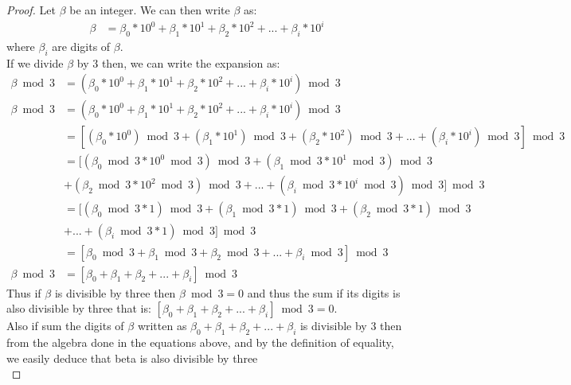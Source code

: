 \documentclass[12pt, fullpage]{article}
\begin{document}
\begin{proof}
 Let $\beta$ be an integer. We can then write $\beta$ as:
\begin{align*}
\beta &= \beta_0*10^0 + \beta_1 * 10^1 + \beta_2 * 10^2 + ... + \beta_i * 10^i
\end{align*}
where $\beta_i$ are digits of $\beta$.\\
If we divide $\beta$ by 3 then, we can write the expansion as: 
\begin{align*}
\beta\bmod 3 &= ( \beta_0*10^0 + \beta_1 * 10^1 + \beta_2 * 10^2 + ... + \beta_i * 10^i ) \bmod 3\\
\beta\bmod 3 &= ( \beta_0*10^0 + \beta_1 * 10^1 + \beta_2 * 10^2 + ... + \beta_i * 10^i ) \bmod 3  \\
&= [ (\beta_0*10^0) \bmod 3 + (\beta_1 * 10^1) \bmod 3 + (\beta_2 * 10^2) \bmod 3 + ... + (\beta_i * 10^i) \bmod 3 ]\bmod 3 \\
&= [ (\beta_0\bmod 3*10^0\bmod3) \bmod 3 + (\beta_1\bmod 3 * 10^1\bmod 3) \bmod 3 \\& +(\beta_2\bmod 3 * 10^2\bmod 3) \bmod 3 + ... + (\beta_i\bmod 3 * 10^i\bmod 3) \bmod 3 ]\bmod 3 \\
&=[(\beta_0\bmod 3*1) \bmod 3 + (\beta_1\bmod 3 * 1) \bmod 3 +(\beta_2\bmod 3 * 1)\bmod 3 \\& + ... + (\beta_i\bmod 3 * 1) \bmod 3 ]\bmod 3\\
&= [ \beta_0 \bmod 3 + \beta_1\bmod 3+\beta_2\bmod 3 + ... + \beta_i\bmod 3 ]\bmod 3\\
\beta\bmod 3 &= [ \beta_0+ \beta_1 + \beta_2 + ... + \beta_i ]\bmod 3
\end{align*}
Thus if $\beta$ is divisible by three then $\beta\bmod 3 = 0$ and thus the sum if its digits is also divisible by three that is: $[ \beta_0+ \beta_1 + \beta_2 + ... + \beta_i ]\bmod 3 = 0$.\\
Also if sum the digits of $\beta$ written as $\beta_0+ \beta_1 + \beta_2 + ... + \beta_i $ is divisible by 3 then from the algebra done in the equations above, and by the definition of equality, we easily deduce that beta is also divisible by three\\ 

\end{proof}
\end{document}
